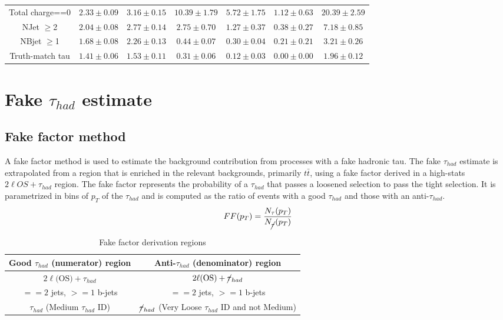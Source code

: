 \documentclass[11pt]{article}
\begin{document}
\begin{table}[H]
{\begin{tabular}{|c|c|c|c|c|c|c|}
		Total charge==0   &    $2.33 \pm 0.09$ &      $3.16 \pm 0.15$ &       $10.39 \pm 1.79$ &              $5.72 \pm 1.75$ &          $1.12 \pm 0.63$ &             $20.39 \pm 2.59$\\
		NJet $\ge$2       &    $2.04 \pm 0.08$ &      $2.77 \pm 0.14$ &        $2.75 \pm 0.70$ &              $1.27 \pm 0.37$ &          $0.38 \pm 0.27$ &              $7.18 \pm 0.85$\\
		NBjet $\ge$1        &    $1.68 \pm 0.08$ &      $2.26 \pm 0.13$ &        $0.44 \pm 0.07$ &              $0.30 \pm 0.04$ &          $0.21 \pm 0.21$ &              $3.21 \pm 0.26$\\
		Truth-match tau &    $1.41 \pm 0.06$ &      $1.53 \pm 0.11$ &        $0.31 \pm 0.06$ &              $0.12 \pm 0.03$ &          $0.00 \pm 0.00$ &              $1.96 \pm 0.12$\\
		\hline
		\end{tabular}}
	\end{table}


	\section{Fake $\tau_{had}$ estimate} 
	\subsection{Fake factor method} 
	A fake factor method is used to estimate the background contribution from processes with a fake hadronic tau. The fake $\tau_{had}$ estimate is extrapolated from a region that is enriched in the relevant backgrounds, primarily $t\bar{t}$, using a fake factor derived in a high-stats $2\ell OS+\tau_{had}$ region. The fake factor represents the probability of a $\tau_{had}$ that passes a loosened selection to pass the tight selection. It is parametrized in bins of $p_T$ of the $\tau_{had}$ and is computed as the ratio of events with a good $\tau_{had}$ and those with an anti-$\tau_{had}$. \\

	\begin{equation}
		FF(p_T) = \frac{N_\tau (p_T)}{N_{\cancel{\tau}} (p_T)  }   
	\end{equation}

	\begin{table}[htp]
		\caption{Fake factor derivation regions} 
		\begin{center}
			\begin{tabular}{|c|c|}
			\hline
			Good $\tau_{had}$ (numerator) region		& Anti-$\tau_{had}$ (denominator) region	\\
			\hline
			$2\ell \text{(OS)}+\tau_{had}$ 			& $2\ell \text{(OS)}+\cancel{\tau}_{had}$\\
			$==2$ jets, $>=1$ b-jets				& $==2$ jets, $>=1$ b-jets\\
			$\tau_{had}$ (Medium $\tau_{had}$ ID) 	& $\cancel{\tau}_{had}$ (Very Loose $\tau_{had}$ ID and not Medium) \\
			\hline
			\end{tabular}
		\end{center}
	\end{table}%
\end{document}
